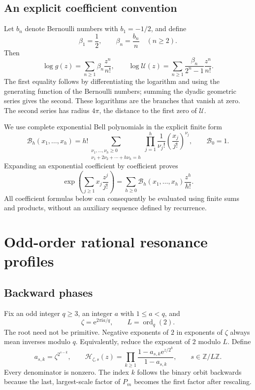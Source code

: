 \documentclass[11pt,letterpaper]{article}
\numberwithin{equation}{section}
\theoremstyle{definition}
\theoremstyle{remark}
\newcommand{\Z}{\mathbb Z}
\newcommand{\ii}{\mathrm i}
\newcommand{\ord}{\operatorname{ord}}
\newcommand{\B}{\mathcal B}
\newcommand{\Up}{\mathcal U}
\newcommand{\Hp}{\mathcal H}
\newcommand{\e}{\mathrm e}
\begin{document}
\subsection{An explicit coefficient convention}
Let \(b_n\) denote Bernoulli numbers with \(b_1=-1/2\), and define
\begin{equation}
 \beta_1=\frac12,\qquad \beta_n=\frac{b_n}{n}\quad(n\geq2).
 \label{eq:beta}
\end{equation}
Then
\begin{equation}
 \log g(z)=\sum_{n\geq1}\beta_n\frac{z^n}{n!},\qquad
 \log\Up(z)=\sum_{n\geq1}\frac{\beta_n}{2^n-1}\frac{z^n}{n!}.
 \label{eq:Ulog}
\end{equation}
The first equality follows by differentiating the logarithm and using the generating function of the Bernoulli numbers; summing the dyadic geometric series gives the second. These logarithms are the branches that vanish at zero. The second series has radius \(4\pi\), the distance to the first zero of \(\Up\).

We use complete exponential Bell polynomials in the explicit finite form
\begin{equation}
 \B_h(x_1,\ldots,x_h)
 =h!\!\sum_{\substack{\nu_1,\ldots,\nu_h\geq0\\
                       \nu_1+2\nu_2+\cdots+h\nu_h=h}}
 \prod_{j=1}^h\frac{1}{\nu_j!}
 \left(\frac{x_j}{j!}\right)^{\nu_j},\qquad \B_0=1.
 \label{eq:Bell}
\end{equation}
Expanding an exponential coefficient by coefficient proves
\begin{equation}
 \exp\left(\sum_{j\geq1}x_j\frac{z^j}{j!}\right)
 =\sum_{h\geq0}\B_h(x_1,\ldots,x_h)\frac{z^h}{h!}.
 \label{eq:BellGF}
\end{equation}
All coefficient formulas below can consequently be evaluated using finite sums and products, without an auxiliary sequence defined by recurrence.

\section{Odd-order rational resonance profiles}
\label{sec:profiles}

\subsection{Backward phases}
Fix an odd integer \(q\geq3\), an integer \(a\) with \(1\leq a<q\), and
\begin{equation}
 \zeta=\e^{2\pi\ii a/q},\qquad L=\ord_q(2).
\end{equation}
The root need not be primitive. Negative exponents of \(2\) in exponents of \(\zeta\) always mean inverses modulo \(q\). Equivalently, reduce the exponent of \(2\) modulo \(L\). Define
\begin{equation}
 a_{s,k}=\zeta^{2^{s-k}},\qquad
 \Hp_{\zeta,s}(z)=\prod_{k\geq1}
 \frac{1-a_{s,k}\e^{z/2^k}}{1-a_{s,k}},
 \qquad s\in\Z/L\Z.
 \label{eq:H}
\end{equation}
Every denominator is nonzero. The index \(k\) follows the binary orbit backwards because the last, largest-scale factor of \(P_m\) becomes the first factor after rescaling.
\end{document}
